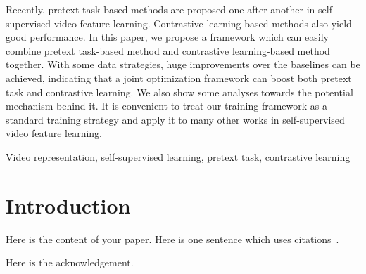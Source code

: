 \documentclass[technicalreport, dvipdfmx]{ieicej_en}
\begin{document}
\begin{eabstract}
Recently, pretext task-based methods are proposed one after another in self-supervised video feature learning. Contrastive learning-based methods also yield good performance. In this paper, we propose a framework which can easily combine pretext task-based method and contrastive learning-based method together. With some data strategies, huge improvements over the baselines can be achieved, indicating that a joint optimization framework can boost both pretext task and contrastive learning. We also show some analyses towards the potential mechanism behind it. It is convenient to treat our training framework as a standard training strategy and apply it to many other works in self-supervised video feature learning.
\end{eabstract}
\begin{ekeyword}
Video representation, self-supervised learning, pretext task, contrastive learning
\end{ekeyword}
\maketitle


\section{Introduction}
Here is the content of your paper.
Here is one sentence which uses citations~\cite{tao2020self}.
	

\ack %
Here is the acknowledgement.





	
\end{document}
